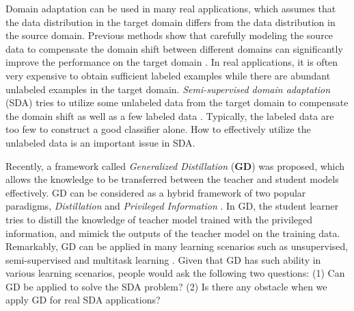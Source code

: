 
Domain adaptation can be used in many real applications, which assumes that the data distribution in the target domain differs from the data distribution in the source domain. Previous methods show that carefully modeling the source data to compensate the domain shift between different domains can significantly improve the performance on the target domain \cite{Donahue_2013_CVPR}. In real applications, it is often very expensive to obtain sufficient labeled examples while there are abundant unlabeled examples in the target domain. 
\textit{Semi-supervised domain adaptation} (SDA) tries to utilize some unlabeled data from the target domain to compensate the domain shift as well as a few labeled data \cite{karl2001long}. Typically, the labeled data are too few to  construct a good classifier alone. How to effectively utilize the unlabeled data is an important issue in SDA. 

Recently, a framework called \textit{Generalized Distillation} (\textbf{GD}) \cite{lopez2015unifying} was proposed, which allows the knowledge to be transferred between the teacher and student models effectively. GD can be considered as a hybrid framework of two popular paradigms, \textit{Distillation} \cite{hinton2015distilling} and \textit{Privileged Information} \cite{vapnik2015learning}. In GD, the student learner tries to distill the knowledge of teacher model trained with the privileged information, and mimick the outputs of the teacher model on the training data. Remarkably, GD can be applied in many learning scenarios such as unsupervised, semi-supervised and multitask learning \cite{lopez2015unifying}. Given that GD has such ability in various learning scenarios, people would ask the following two questions: (1) Can GD be applied to solve the SDA problem? (2) Is there any obstacle when we apply GD for real SDA applications?

